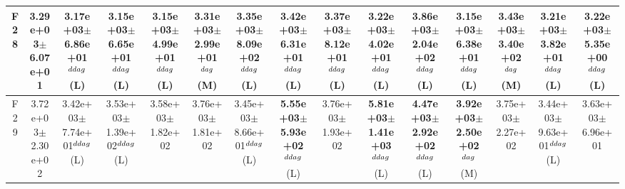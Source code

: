 \begin{table}[!t]
\begin{tabular}{c|cccccccccccccc}
F28  & 3.29e+03$\pm$6.07e+01  & 3.17e+03$\pm$6.86e+01$^{\\ddag}$ (L)  & 3.15e+03$\pm$6.65e+01$^{\\ddag}$ (L)  & 3.15e+03$\pm$4.99e+01$^{\\ddag}$ (L)  & \textbf{3.31e+03$\pm$2.99e+01}$^{\\dag}$ (M)  & \textbf{3.35e+03$\pm$8.09e+02}$^{\\ddag}$ (L)  & \textbf{3.42e+03$\pm$6.31e+01}$^{\\ddag}$ (L)  & \textbf{3.37e+03$\pm$8.12e+01}$^{\\ddag}$ (L)  & 3.22e+03$\pm$4.02e+01$^{\\ddag}$ (L)  & \textbf{3.86e+03$\pm$2.04e+02}$^{\\ddag}$ (L)  & 3.15e+03$\pm$6.38e+01$^{\\ddag}$ (L)  & \textbf{3.43e+03$\pm$3.40e+02}$^{\\dag}$ (M)  & 3.21e+03$\pm$3.82e+01$^{\\ddag}$ (L)  & 3.22e+03$\pm$5.35e+00$^{\\ddag}$ (L) \\ \hline
F29  & 3.72e+03$\pm$2.30e+02  & 3.42e+03$\pm$7.74e+01$^{\\ddag}$ (L)  & 3.53e+03$\pm$1.39e+02$^{\\ddag}$ (L)  & 3.58e+03$\pm$1.82e+02   & 3.76e+03$\pm$1.81e+02   & 3.45e+03$\pm$8.66e+01$^{\\ddag}$ (L)  & \textbf{5.55e+03$\pm$5.93e+02}$^{\\ddag}$ (L)  & 3.76e+03$\pm$1.93e+02   & \textbf{5.81e+03$\pm$1.41e+03}$^{\\ddag}$ (L)  & \textbf{4.47e+03$\pm$2.92e+02}$^{\\ddag}$ (L)  & \textbf{3.92e+03$\pm$2.50e+02}$^{\\dag}$ (M)  & 3.75e+03$\pm$2.27e+02   & 3.44e+03$\pm$9.63e+01$^{\\ddag}$ (L)  & 3.63e+03$\pm$6.96e+01  \\ \hline
\end{tabular}
\end{table}
